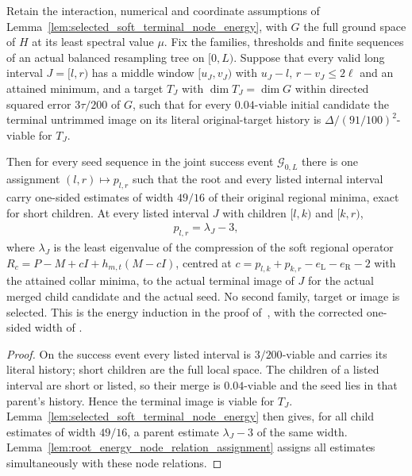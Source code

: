\begin{lemma}
    \label{thm:successful_tree_energy_induction}
    \leanok
    Retain the interaction, numerical and coordinate assumptions of
    Lemma~\ref{lem:selected_soft_terminal_node_energy}, with $G$ the full
    ground space of $H$ at its least spectral value $\mu$. Fix the families,
    thresholds and finite sequences of an actual balanced resampling tree on
    $[0,L)$. Suppose that every valid long interval $J=[l,r)$ has a middle
    window $[u_J,v_J)$ with $u_J-l,\,r-v_J\le2\ell$ and an attained minimum,
    and a target $T_J$ with $\dim T_J=\dim G$ within directed squared error
    $3\tau/200$ of $G$, such that for every $0.04$-viable initial candidate
    the terminal untrimmed image on its literal original-target history is
    $\Delta/(91/100)^2$-viable for $T_J$.

    Then for every seed sequence in the joint success event
    $\mathcal G_{0,L}$ there is one assignment $(l,r)\mapsto p_{l,r}$ such
    that the root and every listed internal interval carry one-sided
    estimates of width $49/16$ of their original regional minima, exact for
    short children. At every listed interval $J$ with children
    $[l,k)$ and $[k,r)$,
    \begin{align*}
        p_{l,r}=\lambda_J-3,
    \end{align*}
    where $\lambda_J$ is the least eigenvalue of the compression of the
    soft regional operator $R_c=P-M+cI+h_{m,t}(M-cI)$, centred at
    $c=p_{l,k}+p_{k,r}-e_{\mathrm L}-e_{\mathrm R}-2$ with the attained
    collar minima, to the actual terminal image of $J$ for the actual
    merged child candidate and the actual seed. No second family, target
    or image is selected. This is the energy induction in the proof
    of~\cite[Theorem~\texttt{t:alg1}, lines 1779--1818]{Arad2016RigorousRG},
    with the corrected one-sided width of
    \cite{gap:alvv16_soft_regional_energy_centering}.
\end{lemma}
\begin{proof}\leanok
    On the success event every listed interval is $3/200$-viable and
    carries its literal history; short children are the full local space.
    The children of a listed interval are short or listed, so their merge
    is $0.04$-viable and the seed lies in that parent's history. Hence the
    terminal image is viable for $T_J$. Lemma~\ref{lem:selected_soft_terminal_node_energy}
    then gives, for all child estimates of width $49/16$, a parent estimate
    $\lambda_J-3$ of the same width. Lemma~\ref{lem:root_energy_node_relation_assignment}
    assigns all estimates simultaneously with these node relations.
\end{proof}

